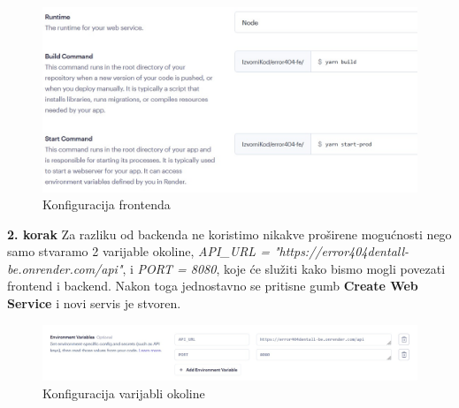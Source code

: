 			\begin{figure}[H]
				\includegraphics[width=\linewidth]{slike/FrontendPtOne.JPG}
				\centering
				\caption{Konfiguracija frontenda}
				\label{fig:Frontend prvi}
			\end{figure}
			\textbf{2. korak} \newline
			Za razliku od backenda ne koristimo nikakve proširene mogućnosti nego samo stvaramo 2 varijable okoline, \textit{API\_URL = "https://error404dentall-be.onrender.com/api"}, i \textit{PORT = 8080},
			koje će služiti kako bismo mogli povezati frontend i backend. Nakon toga jednostavno se pritisne gumb \textbf{Create Web Service} i novi servis je stvoren.
			\begin{figure}[H]
				\includegraphics[width=\linewidth]{slike/FrontendPtToo.JPG}
				\centering
				\caption{Konfiguracija varijabli okoline}
				\label{fig:Frontend drugi}
			\end{figure}
			
			
			\eject 
